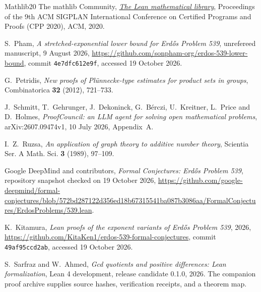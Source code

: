 \documentclass[11pt]{amsart}
\theoremstyle{definition}
\theoremstyle{remark}
\begin{document}
\begin{thebibliography}{Mathlib20}
The mathlib Community, \emph{\href{https://doi.org/10.1145/3372885.3373824}{The Lean mathematical library}}, Proceedings of the 9th ACM SIGPLAN International Conference on Certified Programs and Proofs (CPP 2020), ACM, 2020.

S.~Pham, \emph{A stretched-exponential lower bound for Erd\H{o}s Problem 539}, unrefereed manuscript, 9 August 2026, \url{https://github.com/sonpham-org/erdos-539-lower-bound}, commit \texttt{4e7dfc612e9f}, accessed 19 October 2026.

G.~Petridis, \emph{New proofs of Pl\"unnecke-type estimates for product sets in groups}, Combinatorica \textbf{32} (2012), 721--733.

J.~Schmitt, T.~Gehrunger, J.~Dekoninck, G.~B\'erczi, U.~Kreitner, L.~Price and D.~Holmes, \emph{ProofCouncil: an LLM agent for solving open mathematical problems}, arXiv:2607.09474v1, 10 July 2026, Appendix~A.

I.~Z.~Ruzsa, \emph{An application of graph theory to additive number theory}, Scientia Ser. A Math. Sci. \textbf{3} (1989), 97--109.

Google DeepMind and contributors, \emph{Formal Conjectures: Erd\H{o}s Problem 539}, repository snapshot checked on 19 October 2026, \url{https://github.com/google-deepmind/formal-conjectures/blob/572bd287122d356ed18b67315541ba087b3086aa/FormalConjectures/ErdosProblems/539.lean}.

K.~Kitamura, \emph{Lean proofs of the exponent variants of Erd\H{o}s Problem 539}, 2026, \url{https://github.com/KitaKen1/erdos-539-formal-conjectures}, commit \texttt{49af95ccd2ab}, accessed 19 October 2026.

S.~Sarfraz and W.~Ahmed, \emph{Gcd quotients and positive differences: Lean formalization}, Lean 4 development, release candidate 0.1.0, 2026. The companion proof archive supplies source hashes, verification receipts, and a theorem map.

\end{thebibliography}
\end{document}
